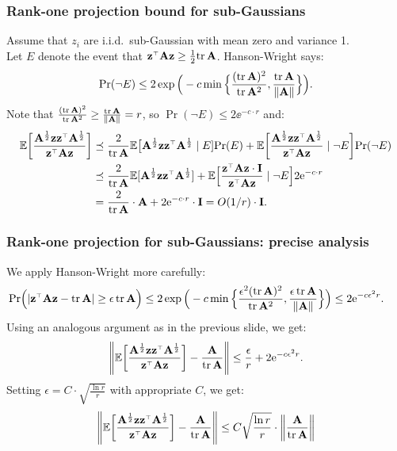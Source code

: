 \documentclass[10pt]{beamer}
\begin{document}
\begin{frame}
  \frametitle{Rank-one projection bound for sub-Gaussians}
  Assume that $z_i$ are i.i.d.~sub-Gaussian with mean zero and variance 1.\\
  Let $E$ denote the event that
  $\z^\top\A\z\geq\frac12\tr\,\A$. Hanson-Wright says:
  \begin{align*}
\mathrm{Pr}(\neg E)\leq 2\exp\Big(-c\min\Big\{\frac{(\mathrm{tr}\,\mathbf A)^2}{\mathrm{tr}\,\mathbf A^2},\frac{\mathrm{tr}\,\mathbf A}{\|\mathbf A\|}\Big\}\Big).
  \end{align*}  
Note that $\frac{(\mathrm{tr}\,\mathbf A)^2}{\mathrm{tr}\,\mathbf A^2}\geq
\frac{\mathrm{tr}\,\mathbf A}{\|\mathbf A\|}=r$, so $\Pr(\neg E)\leq 2\ee^{-c\cdot r}$ and:
  \begin{align*}
    \E\bigg[\frac{\A^{\frac12}\z\z^\top\A^{\frac12}}{\z^\top\A\z}\bigg]
    &\preceq \frac2{\tr\,\A} \E\big[\A^{\frac12}\z\z^\top\A^{\frac12}\mid E]\Pr(E)      + 
      \E\bigg[\frac{\A^{\frac12}\z\z^\top\A^{\frac12}}{\z^\top\A\z}\mid \neg E\bigg]\Pr(\neg E)\\
    &\preceq \frac 2{\tr\,\A}\E[\A^{\frac12}\z\z^\top \A^{\frac12}] +
\E\Big[\frac{\z^\top\A\z\cdot \I}{\z^\top\A\z}\mid
      \neg E\Big]2\ee^{-c\cdot r}\\
    &= \frac {2}{\tr\,\A}\cdot \A + 2\ee^{-c\cdot r}\cdot \I =
      O(1/r)\cdot \I.
  \end{align*}
\end{frame}

\begin{frame}
  \frametitle{Rank-one projection for sub-Gaussians: precise analysis}
  We apply Hanson-Wright more carefully:
  \begin{align*}
    \hspace{-6mm}\Pr\Big(|\z^\top\A\z-\tr\,\A|\geq \epsilon\,\tr\,\A\Big)\leq 
    2\exp\Big(-c\min\Big\{\frac{\epsilon^2(\tr\,\A)^2}{\tr\,\A^2},
    \frac{\epsilon\,\tr\,\A}{\|\A\|}\Big\}\Big)
    \leq 2\ee^{-c\epsilon^2 r}.
  \end{align*}
  Using an analogous argument as in the previous slide, we get:
  \begin{align*}
    \Bigg\|\E\bigg[\frac{\A^{\frac12}\z\z^\top\A^{\frac12}}{\z^\top\A\z}\bigg]
    -\frac{\A}{\tr\,\A}\Bigg\|
    \leq\frac\epsilon r +2\ee^{-c\epsilon^2 r}.
  \end{align*}
  Setting $\epsilon =C\cdot \sqrt{\frac{\ln r}{r}}$ with appropriate $C$, we get:
  \begin{align*}
   \Bigg\|\E\bigg[\frac{\A^{\frac12}\z\z^\top\A^{\frac12}}{\z^\top\A\z}\bigg]
    -\frac{\A}{\tr\,\A}\Bigg\|\leq C \sqrt{\frac{\ln r}{r}}\cdot \bigg\|\frac{\A}{\tr\,\A}\bigg\|
    \end{align*}
  \end{frame}
\end{document}
